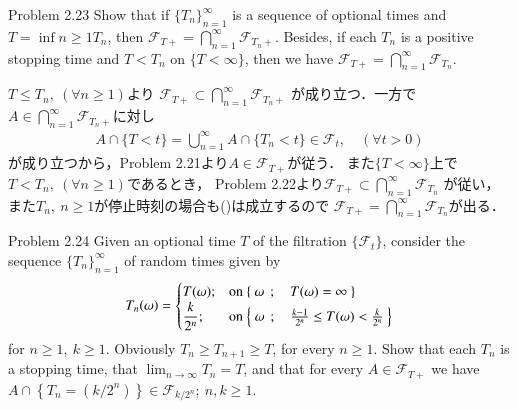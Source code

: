 	\begin{itembox}[l]{Problem 2.23}
		Show that if $\{T_n\}_{n=1}^\infty$ is a sequence of optional times
		and $T = \inf{n \geq 1}{T_n}$, then $\mathscr{F}_{T+} = \bigcap_{n=1}^\infty \mathscr{F}_{T_n+}$.
		Besides, if each $T_n$ is a positive stopping time and $T < T_n$ on
		$\{T < \infty\}$, then we have $\mathscr{F}_{T+} = \bigcap_{n=1}^\infty \mathscr{F}_{T_n}$.
	\end{itembox}
	
	\begin{prf}
		$T \leq T_n,\ (\forall n \geq 1)$より
		$\mathscr{F}_{T+} \subset \bigcap_{n=1}^\infty \mathscr{F}_{T_n+}$
		が成り立つ．一方で$A \in \bigcap_{n=1}^\infty \mathscr{F}_{T_n+}$に対し
		\begin{align}
			A \cap \{T < t\}
			= \bigcup_{n=1}^\infty A \cap \{T_n < t\}
			\in \mathscr{F}_t,
			\quad (\forall t > 0)
			\label{eq:chapter_1_problem_2_23}
		\end{align}
		が成り立つから，Problem 2.21より$A \in \mathscr{F}_{T+}$が従う．
		また$\{T < \infty\}$上で$T < T_n,\ (\forall n \geq 1)$であるとき，
		Problem 2.22より$\mathscr{F}_{T+} \subset \bigcap_{n=1}^\infty \mathscr{F}_{T_n}$
		が従い，また$T_n,\ n \geq 1$が停止時刻の場合も()は成立するので
		$\mathscr{F}_{T+} = \bigcap_{n=1}^\infty \mathscr{F}_{T_n}$が出る．
		\QED
	\end{prf}
	
	\begin{itembox}[l]{Problem 2.24}
		Given an optional time $T$ of the filtration $\{\mathscr{F}_t\}$,
		consider the sequence $\{T_n\}_{n=1}^\infty$ of random times given by
		\begin{align}
			T_n(\omega) = 
			\begin{cases}
				T(\omega); & \mbox{on $\left\{\ \omega\ \, ; \quad T(\omega) = \infty\ \right\}$} \\
				\displaystyle\frac{k}{2^n}; & \mbox{on $\left\{\ \omega\ \, ; \quad \frac{k-1}{2^n} \leq T(\omega) < \frac{k}{2^n}\ \right\}$}
			\end{cases}
		\end{align}
		for $n \geq 1,\ k \geq 1$. Obviously $T_n \geq T_{n+1} \geq T$,
		for every $n \geq 1$. Show that each $T_n$ is a stopping time,
		that $\lim_{n \to \infty} T_n = T$, and that for every $A \in \mathscr{F}_{T+}$
		we have $A \cap \left\{ T_n = (k/2^n) \right\} \in \mathscr{F}_{k/2^n};\ n,k \geq 1$.
	\end{itembox}
	
